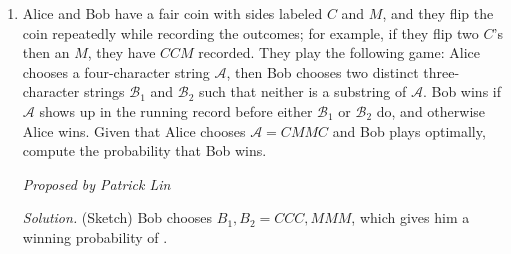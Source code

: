 \documentclass[10pt]{article}
\newcommand{\proposed}[1]
{
\vspace{5pt}
\noindent\textit{Proposed by #1}
}
\newcommand{\solution}
{
\vspace{5pt}
\noindent\textit{Solution.}\qquad
}
\newcommand{\calA}{\mathcal{A}}
\newcommand{\calB}{\mathcal{B}}
\begin{document}
\begin{enumerate}
\begin{itemize}
\end{itemize}

Find $q_3$.

\proposed{David Altizio}

\solution Shift the sequence down by $1$, so that $p_0=0$ and the upper bound in question is $\sqrt 2 - 1$; this makes the arithmetic a little bit easier. It is not hard to see that $p_1/q_1=1/3$ and $p_2/q_2 = 2/5$ are the first two terms of this sequence; the difficult part lies in extending this further.

\par Write $p_3 = (2q_3+r_3)/5$, where $0<q_3<5$.  The condition that $p_3/q_3<\sqrt 2-1$ is equivalent to \[\left(\dfrac{p_3+q_3}{q_3}\right)^2 < 2\quad\implies\quad q_3^2>p_3^2+2p_3q_3.\] Making the substitution yields \begin{align*}q_3^2 &> \left(\dfrac{2q_3+r_3}5\right)^2 + 2\left(\dfrac{2q_3+r_3}5\right)q_3\\&=\dfrac{24}{25}q_3^2+\dfrac{14}{25}q_3r_3+\dfrac1{25}r_3^2\\\implies q_3^2 &> 14q_3r_3+r_3^2.\end{align*} Note that we necessarily need $q_3>14$, since otherwise the RHS will be strictly bigger.  In addition, in order to minimize $q_3$, we need $r_3=1$.  The smallest integer such that this is the case is $q_3=17$.  Indeed, we find that this works with $p_3=7$, so our answer is $\boxed{17}$.

\item Alice and Bob have a fair coin with sides labeled $C$ and $M$, and they flip the coin repeatedly while recording the outcomes; for example, if they flip two $C$'s then an $M$, they have $CCM$ recorded. They play the following game: Alice chooses a four-character string $\calA$, then Bob chooses two distinct three-character strings $\calB_1$ and $\calB_2$ such that neither is a substring of $\calA$. Bob wins if $\calA$ shows up in the running record before either $\calB_1$ or $\calB_2$ do, and otherwise Alice wins. Given that Alice chooses $\calA = CMMC$ and Bob plays optimally, compute the probability that Bob wins.

\proposed{Patrick Lin}



\solution (Sketch) Bob chooses $B_1, B_2 = CCC, MMM$, which gives him a winning probability of .


\end{enumerate}
\end{document}
